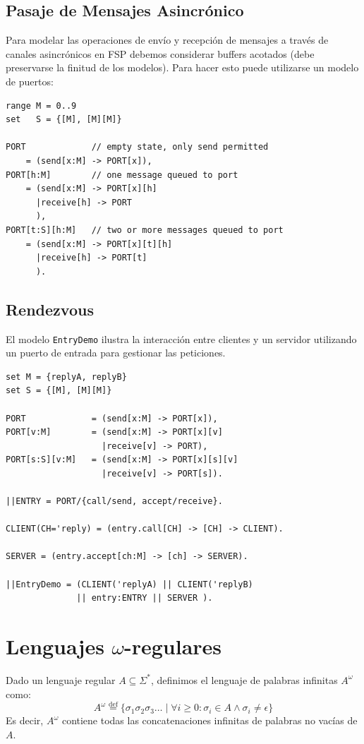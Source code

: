 \documentclass[11pt,a4paper]{article}
\begin{document}
\subsection{Pasaje de Mensajes Asincrónico}
Para modelar las operaciones de envío y recepción de mensajes a través de canales asincrónicos en FSP debemos considerar buffers acotados (debe preservarse la finitud de los modelos). Para hacer esto puede utilizarse un modelo de puertos:

\begin{lstlisting}[caption=Modelo de Puertos (Asincrónico)]
range M = 0..9
set   S = {[M], [M][M]}

PORT             // empty state, only send permitted
    = (send[x:M] -> PORT[x]),
PORT[h:M]        // one message queued to port
    = (send[x:M] -> PORT[x][h]
      |receive[h] -> PORT
      ),
PORT[t:S][h:M]   // two or more messages queued to port
    = (send[x:M] -> PORT[x][t][h]
      |receive[h] -> PORT[t]
      ).
\end{lstlisting}

\subsection{Rendezvous}
El modelo \texttt{EntryDemo} ilustra la interacción entre clientes y un servidor utilizando un puerto de entrada para gestionar las peticiones.

\begin{lstlisting}[caption=Modelo de Rendezvous en FSP]
set M = {replyA, replyB}
set S = {[M], [M][M]}

PORT             = (send[x:M] -> PORT[x]),
PORT[v:M]        = (send[x:M] -> PORT[x][v]
                   |receive[v] -> PORT),
PORT[s:S][v:M]   = (send[x:M] -> PORT[x][s][v]
                   |receive[v] -> PORT[s]).

||ENTRY = PORT/{call/send, accept/receive}.

CLIENT(CH='reply) = (entry.call[CH] -> [CH] -> CLIENT).

SERVER = (entry.accept[ch:M] -> [ch] -> SERVER).

||EntryDemo = (CLIENT('replyA) || CLIENT('replyB) 
              || entry:ENTRY || SERVER ).
\end{lstlisting}


\section{Lenguajes $\omega$-regulares}
Dado un lenguaje regular $A \subseteq \Sigma^*$, definimos el lenguaje de palabras infinitas $A^\omega$ como:
\[ A^\omega \stackrel{\text{def}}{=} \{ \sigma_1\sigma_2\sigma_3 \dots \mid \forall i \geq 0 : \sigma_i \in A \land \sigma_i \neq \epsilon \} \]
Es decir, $A^\omega$ contiene todas las concatenaciones infinitas de palabras no vacías de $A$.
\end{document}
